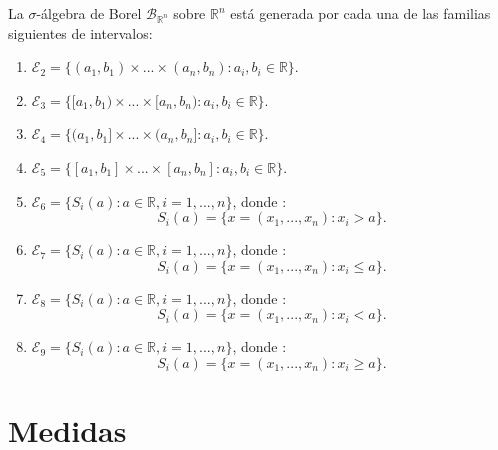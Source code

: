 \begin{prop}
La $\sigma$-álgebra de Borel $\mathcal{B}_{\mathbb{R}^n}$ sobre $\mathbb{R}^n$ está generada por cada una de las familias siguientes de intervalos:
\begin{enumerate}
    \item[(a)] $\mathcal{E}_2 = \{(a_1,b_1) \times ... \times (a_n,b_n) : a_i,b_i \in \mathbb{R} \}$.
    \item[(b)] $\mathcal{E}_3 = \{[a_1,b_1) \times ... \times [a_n,b_n) : a_i,b_i \in \mathbb{R} \}$.
    \item[(c)] $\mathcal{E}_4 = \{(a_1,b_1] \times ... \times (a_n,b_n] : a_i,b_i \in \mathbb{R} \}$.
    \item[(d)] $\mathcal{E}_5 = \{[a_1,b_1] \times ... \times [a_n,b_n] : a_i,b_i \in \mathbb{R} \}$.
    \item[(e)] $\mathcal{E}_6 = \{ S_i(a) : a \in \mathbb{R}, i = 1,..., n \} $, donde :
        $$S_i(a) = \{ x = (x_1, ..., x_n) : x_i > a \}.$$
    \item[(f)] $\mathcal{E}_7 = \{ S_i(a) : a \in \mathbb{R}, i = 1,..., n \} $, donde :
        $$S_i(a) = \{ x = (x_1, ..., x_n) : x_i \leq a \}.$$
    \item[(g)] $\mathcal{E}_8 = \{ S_i(a) : a \in \mathbb{R}, i = 1,..., n \} $, donde :
        $$S_i(a) = \{ x = (x_1, ..., x_n) : x_i < a \}.$$
    \item[(h)] $\mathcal{E}_9 = \{ S_i(a) : a \in \mathbb{R}, i = 1,..., n \} $, donde :
        $$S_i(a) = \{ x = (x_1, ..., x_n) : x_i \ge a \}.$$
\end{enumerate}
\end{prop}
\section{Medidas}
